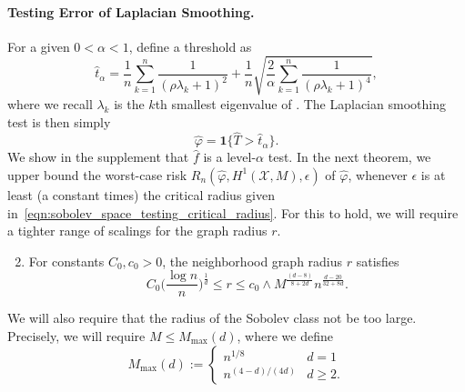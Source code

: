 \documentclass[twoside]{article}
\newcommand{\1}{\mathbf{1}}
\newcommand{\mc}[1]{\mathcal{#1}}
\newcommand{\wh}[1]{\widehat{#1}}
\theoremstyle{definition}
\theoremstyle{remark}
\begin{document}
\paragraph{Testing Error of Laplacian Smoothing.}

For a given $0 < \alpha < 1$, define a threshold \smash{$\wh{t}_{\alpha}$} as
\begin{equation*}
\wh{t}_{\alpha} = \frac{1}{n}\sum_{k = 1}^{n} \frac{1}{(\rho \lambda_k + 1)^2} + \frac{1}{n}\sqrt{\frac{2}{\alpha} \sum_{k = 1}^{n} \frac{1}{(\rho \lambda_k + 1)^4}},
\end{equation*}
where we recall $\lambda_k$ is the $k$th smallest eigenvalue of . The Laplacian smoothing test is then simply
\begin{equation*}
\wh{\varphi} = \1\bigl\{\wh{T} > \wh{t}_{\alpha}\bigr\}.
\end{equation*} 
We show in the supplement that $\wh{f}$ is a level-$\alpha$ test. In the next theorem, we upper bound the worst-case risk $R_n(\wh{\varphi},H^1(\mc{X},M),\epsilon)$ of $\wh{\varphi}$, whenever $\epsilon$ is at least (a constant times) the critical radius given in~\eqref{eqn:sobolev_space_testing_critical_radius}. For this to hold, we will require a tighter range of scalings for the graph radius $r$.
\begin{enumerate}[label=(R\arabic*)]
	\setcounter{enumi}{1}
	\item 
	\label{asmp:ls_kernel_radius_testing}
	For constants $C_0,c_0>0$, the neighborhood graph radius $r$ satisfies
	\begin{equation*}
	C_0\biggl(\frac{\log n}{n}\biggr)^{\frac{1}{d}} \leq r \leq c_0 \wedge M^{\frac{(d - 8)}{8 + 2d}} n^{\frac{d - 20}{32 + 8d}}.
	\end{equation*}
\end{enumerate}
We will also require that the radius of the Sobolev class not be too large. Precisely, we will require $M \leq M_{\max}(d)$, where we define
\begin{equation*}
M_{\max}(d) :=
\begin{cases*}
n^{1/8} & \textrm{$d = 1$} \\
n^{(4 - d)/(4d)} & \textrm{$d \geq 2$}.
\end{cases*}
\end{equation*}
\end{document}
